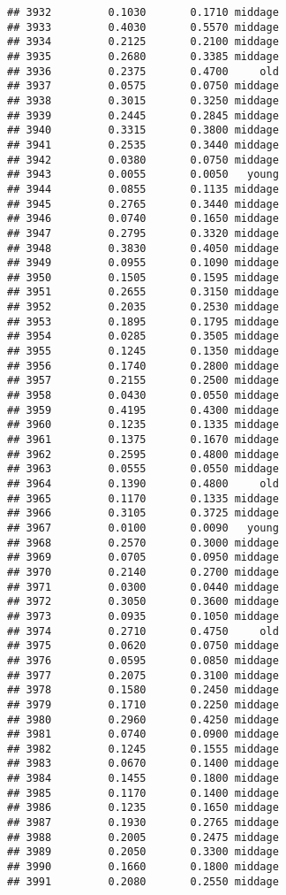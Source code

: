 \documentclass[
]{article}
\begin{document}
\begin{verbatim}
## 3932         0.1030       0.1710 middage
## 3933         0.4030       0.5570 middage
## 3934         0.2125       0.2100 middage
## 3935         0.2680       0.3385 middage
## 3936         0.2375       0.4700     old
## 3937         0.0575       0.0750 middage
## 3938         0.3015       0.3250 middage
## 3939         0.2445       0.2845 middage
## 3940         0.3315       0.3800 middage
## 3941         0.2535       0.3440 middage
## 3942         0.0380       0.0750 middage
## 3943         0.0055       0.0050   young
## 3944         0.0855       0.1135 middage
## 3945         0.2765       0.3440 middage
## 3946         0.0740       0.1650 middage
## 3947         0.2795       0.3320 middage
## 3948         0.3830       0.4050 middage
## 3949         0.0955       0.1090 middage
## 3950         0.1505       0.1595 middage
## 3951         0.2655       0.3150 middage
## 3952         0.2035       0.2530 middage
## 3953         0.1895       0.1795 middage
## 3954         0.0285       0.3505 middage
## 3955         0.1245       0.1350 middage
## 3956         0.1740       0.2800 middage
## 3957         0.2155       0.2500 middage
## 3958         0.0430       0.0550 middage
## 3959         0.4195       0.4300 middage
## 3960         0.1235       0.1335 middage
## 3961         0.1375       0.1670 middage
## 3962         0.2595       0.4800 middage
## 3963         0.0555       0.0550 middage
## 3964         0.1390       0.4800     old
## 3965         0.1170       0.1335 middage
## 3966         0.3105       0.3725 middage
## 3967         0.0100       0.0090   young
## 3968         0.2570       0.3000 middage
## 3969         0.0705       0.0950 middage
## 3970         0.2140       0.2700 middage
## 3971         0.0300       0.0440 middage
## 3972         0.3050       0.3600 middage
## 3973         0.0935       0.1050 middage
## 3974         0.2710       0.4750     old
## 3975         0.0620       0.0750 middage
## 3976         0.0595       0.0850 middage
## 3977         0.2075       0.3100 middage
## 3978         0.1580       0.2450 middage
## 3979         0.1710       0.2250 middage
## 3980         0.2960       0.4250 middage
## 3981         0.0740       0.0900 middage
## 3982         0.1245       0.1555 middage
## 3983         0.0670       0.1400 middage
## 3984         0.1455       0.1800 middage
## 3985         0.1170       0.1400 middage
## 3986         0.1235       0.1650 middage
## 3987         0.1930       0.2765 middage
## 3988         0.2005       0.2475 middage
## 3989         0.2050       0.3300 middage
## 3990         0.1660       0.1800 middage
## 3991         0.2080       0.2550 middage

\end{verbatim}
\end{document}
